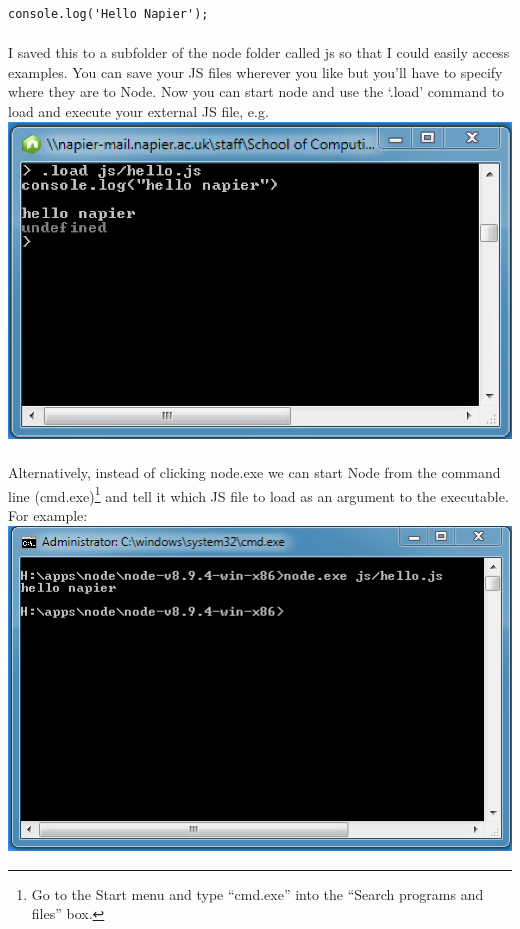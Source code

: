 \documentclass[10pt, a4paper, twosize]{article}
\begin{document}
\begin{lstlisting}
console.log('Hello Napier');
\end{lstlisting}

\paragraph{} I saved this to a subfolder of the node folder called js so that I could easily access examples. You can save your JS files wherever you like but you'll have to specify where they are to Node. Now you can start node and use the `.load' command to load and execute your external JS file, e.g.\\

\includegraphics[width=.8\textwidth]{images/node_repl_external-file}

\paragraph{} Alternatively, instead of clicking node.exe we can start Node from the command line (cmd.exe)\footnote{Go to the Start menu and type ``cmd.exe'' into the ``Search programs and files'' box.} and tell it which JS file to load as an argument to the executable. For example:\\

\includegraphics[width=.8\textwidth]{images/node_external-file}
\end{document}
